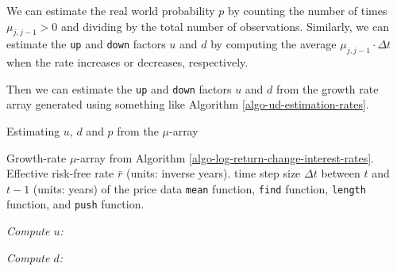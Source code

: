 \documentclass[11pt]{article}
\theoremstyle{definition}
\begin{document}
\begin{concept}\label{concept:real-world-interest-rate-probabilities}
We can estimate the real world probability $p$ by counting the number of times $\mu_{j,j-1}>0$ and 
dividing by the total number of observations. Similarly, we can estimate the \texttt{up} and \texttt{down} factors $u$ and $d$ 
by computing the average $\mu_{j,j-1}\cdot{\Delta{t}}$ when the rate increases or decreases, respectively.
\end{concept}
Then we can estimate the \texttt{up} and \texttt{down} factors $u$ and $d$ from the growth rate array 
generated using something like Algorithm \ref{algo-ud-estimation-rates}. 
\begin{algorithm}[h]
	\caption{Estimating $u$, $d$ and $p$ from the $\mu$-array}\label{algo-ud-estimation-rates}
	\begin{algorithmic}[1]

		\Require Growth-rate $\mu$-array from Algorithm \ref{algo-log-return-change-interest-rates}.
		\Require Effective risk-free rate $\bar{r}$ (units: inverse years).
		\Require time step size $\Delta{t}$ between $t$ and $t-1$ (units: years) of the price data
		\Require \texttt{mean} function, \texttt{find} function, \texttt{length} function, and \texttt{push} function.

		\Statex
		\State
		
		\Statex
		\State \textit{Compute $u$:}
    	\EndFor
    	
		\Statex
		\State \textit{Compute $d$:}
    	\EndFor



		\Statex
		\Statex

		\State
		\Statex
		\EndProcedure
	\end{algorithmic}
\end{algorithm}


\clearpage


\clearpage
\printindex
\end{document}
